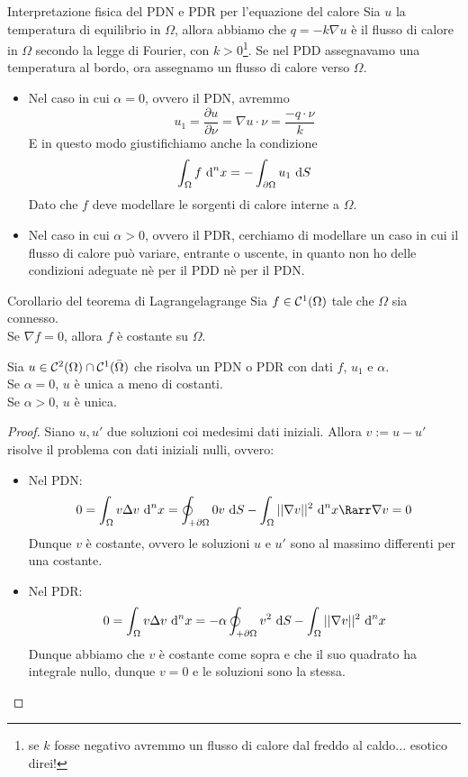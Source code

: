 \documentclass{article}
\begin{document}
\begin{remark}{Interpretazione fisica del PDN e PDR per l'equazione del calore}{}
    Sia $u$ la temperatura di equilibrio in $\Omega$, allora abbiamo che  $q = -k\nabla u $ è il flusso di calore in $\Omega$ secondo la legge di Fourier, con $k>0$\footnote{se $k$ fosse negativo avremmo un flusso di calore dal freddo al caldo... esotico direi!}. Se nel PDD assegnavamo una temperatura al bordo, ora assegnamo un flusso di calore verso $\Omega$.\begin{itemize}
        \item Nel caso in cui $\alpha=0$, ovvero il PDN, avremmo \[u_1 = \frac{\partial u}{\partial \nu} = \nabla u \cdot \nu = \frac{-q\cdot \nu}{k}\] E in questo modo giustifichiamo anche la condizione \[\int_\Omega f\text{ d}^n x =-\int_{\partial \Omega} u_1 \text{ d} S\] Dato che $f$ deve modellare le sorgenti di calore interne a $\Omega$.
        \item Nel caso in cui $\alpha > 0$, ovvero il PDR, cerchiamo di modellare un caso in cui il flusso di calore può variare, entrante o uscente, in quanto non ho delle condizioni adeguate nè per il PDD nè per il PDN.
    \end{itemize}
\end{remark}

\begin{lemma}{Corollario del teorema di Lagrange}{lagrange}
    Sia $f\in\mathcal{C}^1(\Omega)$ tale che $\Omega$ sia connesso.\\
    Se $\nabla f = 0$, allora $f$ è costante su $\Omega$.
\end{lemma}

\begin{theorem}{}{}
    Sia $u \in \mathcal{C}^2(\Omega)\cap\mathcal{C}^1(\bar{\Omega})$ che risolva un PDN o PDR con dati $f$, $u_1$ e $\alpha$.\\
    Se $\alpha=0$, $u$ è unica a meno di costanti.\\
    Se $\alpha>0$, $u$ è unica.
\end{theorem}

\begin{proof}
    Siano $u,u'$ due soluzioni coi medesimi dati iniziali. Allora $v := u-u'$ risolve il problema con dati iniziali nulli, ovvero:\begin{itemize}
        \item Nel PDN:
        \[0 = \int_\Omega v\Delta v \de^n x = \oint_{+\partial\Omega} 0 v\de S - \int_\Omega ||\nabla v||^2 \de^n x \Rarr \nabla v = 0\] Dunque $v$ è costante, ovvero le soluzioni $u$ e $u'$ sono al massimo differenti per una costante.
        \item Nel PDR:
        \[0 = \int_\Omega v\Delta v \text{ d}^n x = -\alpha \oint_{+\partial\Omega} v^2 \text{ d} S - \int_\Omega ||\nabla v||^2 \text{ d}^n x\] Dunque abbiamo che $v$ è costante come sopra e che il suo quadrato ha integrale nullo, dunque $v=0$ e le soluzioni sono la stessa.
    \end{itemize}
\end{proof}
\end{document}

